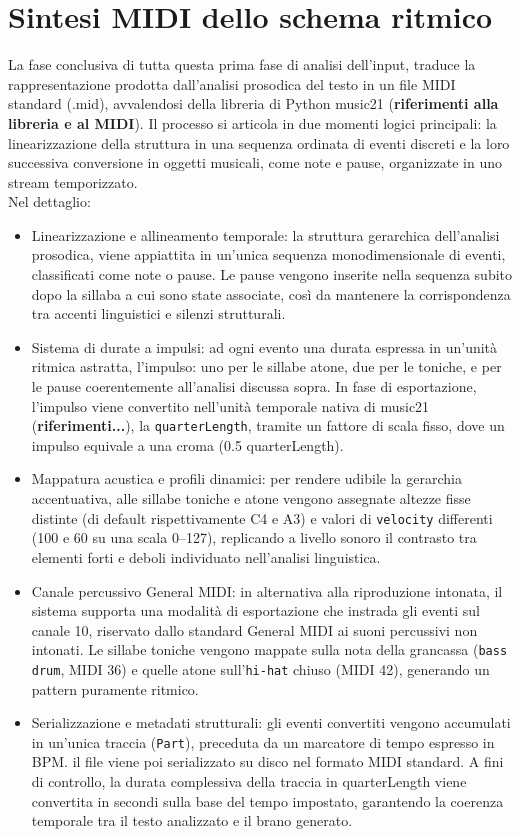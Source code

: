 \section{Sintesi MIDI dello schema ritmico}
La fase conclusiva di tutta questa prima fase di analisi dell'input, traduce la rappresentazione prodotta dall'analisi prosodica del testo in un file 
MIDI standard (.mid), avvalendosi della libreria di Python music21 (\textbf{riferimenti alla libreria e al MIDI}). Il processo si articola in due momenti 
logici principali: la linearizzazione della struttura in una sequenza ordinata di eventi discreti e la loro successiva conversione in oggetti musicali, 
come note e pause, organizzate in uno stream temporizzato.\\
Nel dettaglio:
\begin{itemize}
      \item Linearizzazione e allineamento temporale: la struttura gerarchica dell'analisi prosodica, viene appiattita in un'unica sequenza monodimensionale 
      di eventi, classificati come note o pause. Le pause vengono inserite nella sequenza subito dopo la sillaba a cui sono state associate, così da 
      mantenere la corrispondenza tra accenti linguistici e silenzi strutturali.
      \item Sistema di durate a impulsi: ad ogni evento  una durata espressa in un'unità ritmica astratta, l'impulso: uno per le sillabe atone, due per 
      le toniche, e per le pause coerentemente all'analisi discussa sopra. In fase di esportazione, l'impulso viene convertito nell'unità temporale nativa 
      di music21 (\textbf{riferimenti...}), la \texttt{quarterLength}, tramite un fattore di scala fisso, dove un impulso equivale a una croma 
      (0.5 quarterLength).
      \item Mappatura acustica e profili dinamici: per rendere udibile la gerarchia accentuativa, alle sillabe toniche e atone vengono assegnate altezze 
      fisse distinte (di default rispettivamente C4 e A3) e valori di \texttt{velocity} differenti (100 e 60 su una scala 0–127), replicando a livello 
      sonoro il contrasto tra elementi forti e deboli individuato nell'analisi linguistica.
      \item Canale percussivo General MIDI: in alternativa alla riproduzione intonata, il sistema supporta una modalità di esportazione che instrada 
      gli eventi sul canale 10, riservato dallo standard General MIDI ai suoni percussivi non intonati. Le sillabe toniche vengono mappate sulla nota 
      della grancassa (\texttt{bass drum}, MIDI 36) e quelle atone sull'\texttt{hi-hat} chiuso (MIDI 42), generando un pattern puramente ritmico.
      \item Serializzazione e metadati strutturali: gli eventi convertiti vengono accumulati in un'unica traccia (\texttt{Part}), preceduta da un 
      marcatore di tempo espresso in BPM. il file viene poi serializzato su disco nel formato MIDI standard. A fini di controllo, la durata complessiva 
      della traccia in quarterLength viene convertita in secondi sulla base del tempo impostato, garantendo la coerenza temporale tra il testo analizzato 
      e il brano generato.
\end{itemize}
